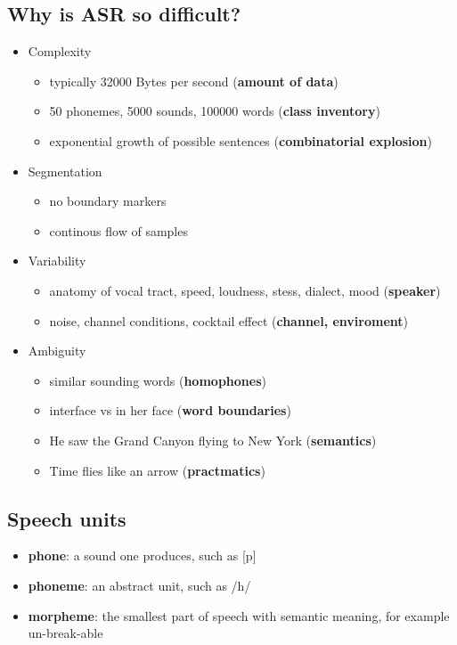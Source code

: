 \subsection{Why is ASR so difficult?}
\begin{itemize}
\item Complexity
\begin{itemize}
\item typically 32000 Bytes per second (\textbf{amount of data})
\item 50 phonemes, 5000 sounds, 100000 words (\textbf{class inventory})
\item exponential growth of possible sentences (\textbf{combinatorial explosion})
\end{itemize}

\item Segmentation
\begin{itemize}
\item no boundary markers 
\item continous flow of samples
\end{itemize}

\item Variability
\begin{itemize}
\item anatomy of vocal tract, speed, loudness, stess, dialect, mood (\textbf{speaker})
\item noise, channel conditions, cocktail effect (\textbf{channel, enviroment})
\end{itemize}

\item Ambiguity
\begin{itemize}
\item similar sounding words (\textbf{homophones})
\item interface vs in her face (\textbf{word boundaries})
\item He saw the Grand Canyon flying to New York (\textbf{semantics})
\item Time flies like an arrow (\textbf{practmatics})

\end{itemize}


\end{itemize}


\subsection{Speech units}

\begin{itemize}
    \item \textbf{phone}: a sound one produces, such as [p]
    \item \textbf{phoneme}: an abstract unit, such as /h/
    \item \textbf{morpheme}: the smallest part of speech with semantic meaning, for example un-break-able
\end{itemize}

